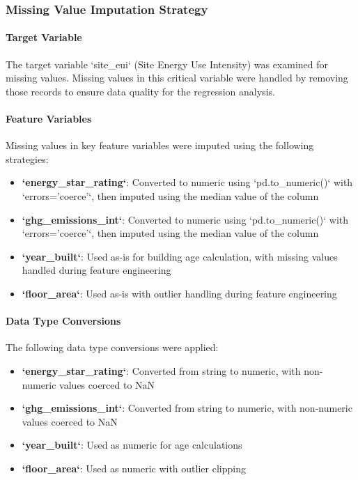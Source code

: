 \subsubsection{Missing Value Imputation Strategy}

\paragraph{Target Variable}
The target variable `site\_eui` (Site Energy Use Intensity) was examined for missing values. Missing values in this critical variable were handled by removing those records to ensure data quality for the regression analysis.

\paragraph{Feature Variables}
Missing values in key feature variables were imputed using the following strategies:
\begin{itemize}
    \item \textbf{`energy\_star\_rating`}: Converted to numeric using `pd.to\_numeric()` with `errors='coerce'`, then imputed using the median value of the column
    \item \textbf{`ghg\_emissions\_int`}: Converted to numeric using `pd.to\_numeric()` with `errors='coerce'`, then imputed using the median value of the column
    \item \textbf{`year\_built`}: Used as-is for building age calculation, with missing values handled during feature engineering
    \item \textbf{`floor\_area`}: Used as-is with outlier handling during feature engineering
\end{itemize}

\paragraph{Data Type Conversions}
The following data type conversions were applied:
\begin{itemize}
    \item \textbf{`energy\_star\_rating`}: Converted from string to numeric, with non-numeric values coerced to NaN
    \item \textbf{`ghg\_emissions\_int`}: Converted from string to numeric, with non-numeric values coerced to NaN
    \item \textbf{`year\_built`}: Used as numeric for age calculations
    \item \textbf{`floor\_area`}: Used as numeric with outlier clipping
\end{itemize}

